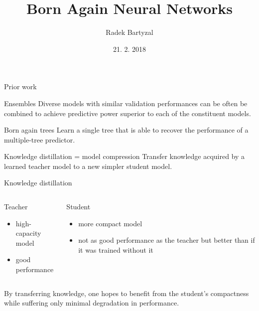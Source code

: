 \documentclass{beamer}
\begin{document}
\title{Born Again Neural Networks}  
\author{Radek Bartyzal}
\date{21. 2. 2018} 

\frame{\titlepage} 

\begin{frame}{Prior work}


\begin{block}{Ensembles}
Diverse models with similar validation performances can be often be combined to achieve predictive
power superior to each of the constituent models. \cite{cit:ensembles}
\end{block}

\begin{block}{Born again trees}
Learn a single tree that is able to recover the performance of a multiple-tree predictor. \cite{cit:bat}
\end{block}

\begin{block}{Knowledge distillation = model compression}
Transfer knowledge acquired by a learned
teacher model to a new simpler student model. \cite{cit:distill}
\end{block}



\end{frame}

\begin{frame}[t]{Knowledge distillation}

\begin{columns}[t]
\begin{column}{0.5\textwidth}
Teacher
\begin{itemize}
\item high-capacity model
\item good performance
\end{itemize}
\end{column}

\begin{column}{0.5\textwidth}
Student
\begin{itemize}
\item more compact model
\item not as good performance as the teacher but better than if it was trained without it
\end{itemize}
\end{column}

\end{columns}

\vfill
By transferring knowledge, one hopes to benefit from the student’s
compactness while suffering only minimal degradation in performance.

\end{frame}
\end{document}
